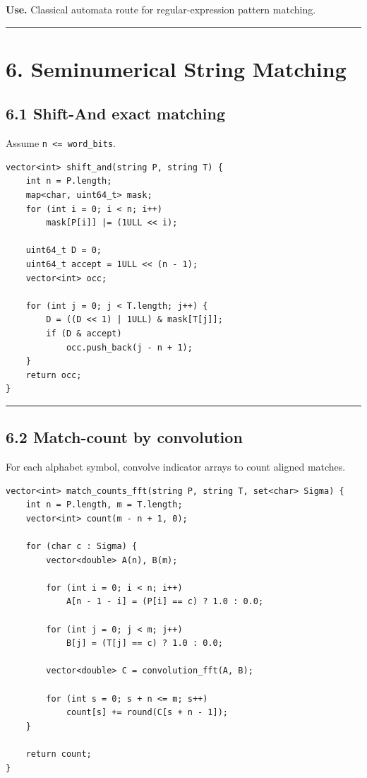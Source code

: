 \documentclass[11pt]{article}
\begin{document}
\textbf{Use.} Classical automata route for regular-expression pattern matching.

\begin{center}\rule{0.5\linewidth}{0.5pt}\end{center}

\section{6. Seminumerical String Matching}\label{seminumerical-string-matching}

\subsection{6.1 Shift-And exact matching}\label{shift-and-exact-matching}

Assume \texttt{n <= word\_bits}.

\begin{verbatim}
vector<int> shift_and(string P, string T) {
    int n = P.length;
    map<char, uint64_t> mask;
    for (int i = 0; i < n; i++)
        mask[P[i]] |= (1ULL << i);

    uint64_t D = 0;
    uint64_t accept = 1ULL << (n - 1);
    vector<int> occ;

    for (int j = 0; j < T.length; j++) {
        D = ((D << 1) | 1ULL) & mask[T[j]];
        if (D & accept)
            occ.push_back(j - n + 1);
    }
    return occ;
}
\end{verbatim}

\begin{center}\rule{0.5\linewidth}{0.5pt}\end{center}

\subsection{6.2 Match-count by convolution}\label{match-count-by-convolution}

For each alphabet symbol, convolve indicator arrays to count aligned matches.

\begin{verbatim}
vector<int> match_counts_fft(string P, string T, set<char> Sigma) {
    int n = P.length, m = T.length;
    vector<int> count(m - n + 1, 0);

    for (char c : Sigma) {
        vector<double> A(n), B(m);

        for (int i = 0; i < n; i++)
            A[n - 1 - i] = (P[i] == c) ? 1.0 : 0.0;

        for (int j = 0; j < m; j++)
            B[j] = (T[j] == c) ? 1.0 : 0.0;

        vector<double> C = convolution_fft(A, B);

        for (int s = 0; s + n <= m; s++)
            count[s] += round(C[s + n - 1]);
    }

    return count;
}
\end{verbatim}
\end{document}
